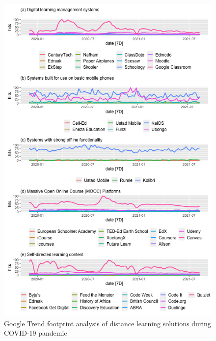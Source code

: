 \documentclass[11pt,a4paper,]{article}
\begin{document}
\begin{figure}[h]

{\centering \includegraphics[width=1\textwidth]{figure/plot1-1} 

}

\caption{Google Trend footprint analysis of distance learning solutions during COVID-19 pandemic}\label{fig:plot1}
\end{figure}
\end{document}
